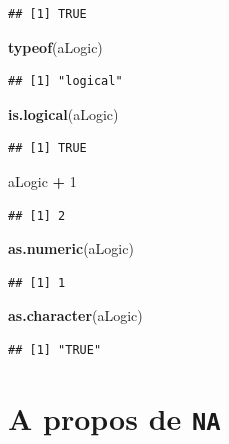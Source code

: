 \documentclass[]{book}
\newenvironment{Shaded}{\begin{snugshade}}{\end{snugshade}}
\newcommand{\DecValTok}[1]{\textcolor[rgb]{0.00,0.00,0.81}{#1}}
\newcommand{\KeywordTok}[1]{\textcolor[rgb]{0.13,0.29,0.53}{\textbf{#1}}}
\newcommand{\NormalTok}[1]{#1}
\newcommand{\OperatorTok}[1]{\textcolor[rgb]{0.81,0.36,0.00}{\textbf{#1}}}
\newcommand{\StringTok}[1]{\textcolor[rgb]{0.31,0.60,0.02}{#1}}
\begin{document}
\begin{verbatim}
## [1] TRUE
\end{verbatim}

\begin{Shaded}
\begin{Highlighting}[]
\KeywordTok{typeof}\NormalTok{(aLogic)}
\end{Highlighting}
\end{Shaded}

\begin{verbatim}
## [1] "logical"
\end{verbatim}

\begin{Shaded}
\begin{Highlighting}[]
\KeywordTok{is.logical}\NormalTok{(aLogic)}
\end{Highlighting}
\end{Shaded}

\begin{verbatim}
## [1] TRUE
\end{verbatim}

\begin{Shaded}
\begin{Highlighting}[]
\NormalTok{aLogic }\OperatorTok{+}\StringTok{ }\DecValTok{1}
\end{Highlighting}
\end{Shaded}

\begin{verbatim}
## [1] 2
\end{verbatim}

\begin{Shaded}
\begin{Highlighting}[]
\KeywordTok{as.numeric}\NormalTok{(aLogic)}
\end{Highlighting}
\end{Shaded}

\begin{verbatim}
## [1] 1
\end{verbatim}

\begin{Shaded}
\begin{Highlighting}[]
\KeywordTok{as.character}\NormalTok{(aLogic)}
\end{Highlighting}
\end{Shaded}

\begin{verbatim}
## [1] "TRUE"
\end{verbatim}

\hypertarget{a-propos-de-na}{%
\section{\texorpdfstring{A propos de \texttt{NA}}{A propos de NA}}\label{a-propos-de-na}}
\end{document}
